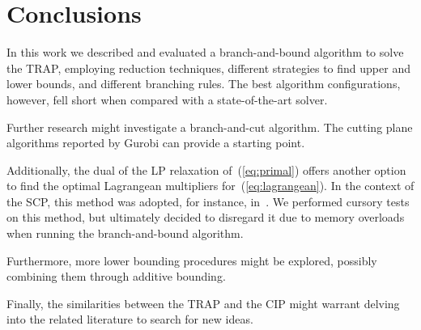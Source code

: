 \documentclass[runningheads]{llncs}
\begin{document}
\section{Conclusions}
\label{sec:conclusions}

In this work we described and evaluated a branch-and-bound algorithm to solve the TRAP, employing reduction techniques, different strategies to find upper and lower bounds, and different branching rules. The best algorithm configurations, however, fell short when compared with a state-of-the-art solver.

Further research might investigate a branch-and-cut algorithm. The cutting plane algorithms reported by Gurobi can provide a starting point.

Additionally, the dual of the LP relaxation of~(\ref{eq:primal}) offers another option to find the optimal Lagrangean multipliers for~(\ref{eq:lagrangean}). In the context of the SCP, this method was adopted, for instance, in~\cite{beasley-1987-algorithm,balas-ho-2009-set-covering}. We performed cursory tests on this method, but ultimately decided to disregard it due to memory overloads when running the branch-and-bound algorithm.

Furthermore, more lower bounding procedures might be explored, possibly combining them through additive bounding.

Finally, the similarities between the TRAP and the CIP might warrant delving into the related literature to search for new ideas. 



\end{document}
